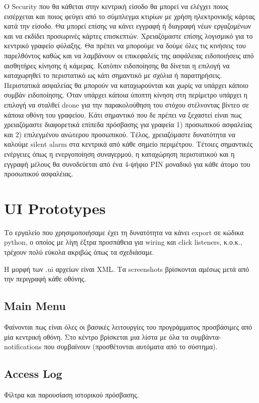 \documentclass{article}
\begin{document}
Ο Security που θα κάθεται στην κεντρική είσοδο θα μπορεί να ελέγχει ποιος εισέρχεται και ποιος φεύγει από το σύμπλεγμα κτιρίων
με χρήση ηλεκτρονικής κάρτας κατά την είσοδο. Θα μπορεί επίσης να κάνει εγγραφή ή διαγραφή νέων εργαζομένων και να εκδίδει προσωρινές κάρτες επισκεπτών. Χρειαζόμαστε επίσης λογισμικό για το κεντρικό γραφείο φύλαξης. Θα πρέπει να μπορούμε να δούμε όλες τις κινήσεις του παρελθόντος καθώς και να λαμβάνουν οι επικεφαλείς της ασφάλειας ειδοποιήσεις από αισθητήρες κίνησης ή κάμερας. Κατόπιν ειδοποίησης θα δίνεται η επιλογή να καταχωρηθεί το περιστατικό ως κάτι σημαντικό με σχόλια ή παρατηρήσεις. Περιστατικά ασφαλείας θα μπορούν να καταχωρούνται και χωρίς να υπάρχει κάποιο συμβάν ειδοποίησης. Όταν υπάρχει κάποια ύποπτη κίνηση στη περίμετρο υπάρχει η επιλογή να σταλθεί drone για την παρακολούθηση του στόχου στέλνοντας βίντεο σε κάποια οθόνη του γραφείου. Κάτι σημαντικό που δε πρέπει να ξεχαστεί είναι πως χρειαζόμαστε διαφορετικά επίπεδα πρόσβασης για γραφεία 1) προσωπικού ασφαλείας και 2) επιλεγμένου ανώτερου προσωπικού. Τέλος, χρειαζόμαστε δυνατότητα να καλούμε silent alarm στα κεντρικά από κάθε σημείο περιμέτρου. Τέτοιες σημαντικές ενέργειες όπως η ενεργοποίηση συναγερμού, η καταχώρηση περιστατικού και η εγγραφή μέλους θα συνοδεύεται από ένα 4-ψήφιο PIN μοναδικό για κάθε άτομο του προσωπικού ασφαλέιας.

\section{UI Prototypes}
Το εργαλείο που χρησιμοποιήσαμε έχει τη δυνατότητα να κάνει export σε κώδικα python, ο οποίος με λίγη έξτρα προσπάθεια για wiring και click listeners, κ.ο.κ., τρέχουν πολύ εύκολα ακριβώς όπως τα σχεδιάσαμε.

Η μορφή των .ui αρχείων είναι XML. Τα screenshots βρίσκονται αμέσως μετά από την περιγραφή κάθε οθόνης.

\subsection{Main Menu}
Φαίνονται πως είναι όλες οι βασικές λειτουργίες του προγράμματος προσβάσιμες από μία κεντρική οθόνη.
Στο κέντρο βρίσκεται μια λίστα με όλα τα συμβάντα-notifications που συμβαίνουν (προσθέτονται αυτόματα από το σύστημα).

\subsection{Access Log}
Φίλτρα και παρουσίαση ιστορικού πρόσβασης.
\end{document}
